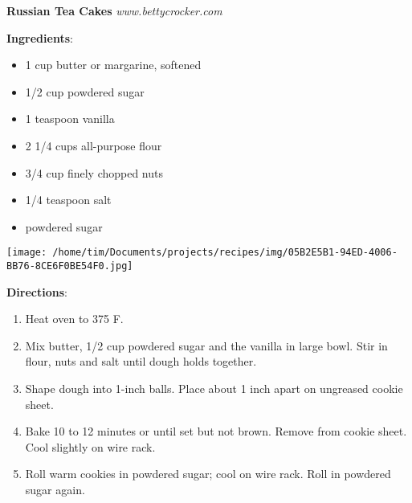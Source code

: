 \documentclass[11pt, twoside, openany]{book}
\begin{document}
\noindent\begin{minipage}[t]{\linewidth}%
{\Large\textbf{Russian Tea Cakes}} \label{russian-tea-cakes}\hfill\textit{www.bettycrocker.com}\\
\noindent\begin{minipage}[t]{0.78\linewidth}%
\textbf{Ingredients}:\vspace{-3mm}
\begin{multicols}{2}
\begin{itemize}\setlength\itemsep{-1mm}
\item 1 cup butter or margarine, softened
\item 1/2 cup powdered sugar
\item 1 teaspoon vanilla
\item 2 1/4 cups all-purpose flour
\item 3/4 cup finely chopped nuts
\item 1/4 teaspoon salt
\item powdered sugar
\end{itemize}
\end{multicols}
\end{minipage}
\noindent\begin{minipage}[t]{0.18\linewidth}
\centering \strut\vspace*{-\baselineskip}\newline
\texttt{[image: /home/tim/Documents/projects/recipes/img/05B2E5B1-94ED-4006-BB76-8CE6F0BE54F0.jpg]}\\
\end{minipage}\vspace{3mm}
\textbf{Directions}:
\vspace{-3mm}\begin{enumerate}\setlength\itemsep{-1mm}
\item Heat oven to 375 F.
\item Mix butter, 1/2 cup powdered sugar and the vanilla in large bowl. Stir in flour, nuts and salt until dough holds together.
\item Shape dough into 1-inch balls. Place about 1 inch apart on ungreased cookie sheet.
\item Bake 10 to 12 minutes or until set but not brown. Remove from cookie sheet. Cool slightly on wire rack.
\item Roll warm cookies in powdered sugar; cool on wire rack. Roll in powdered sugar again.
\end{enumerate}
\end{minipage}\vspace{8mm}
\end{document}
